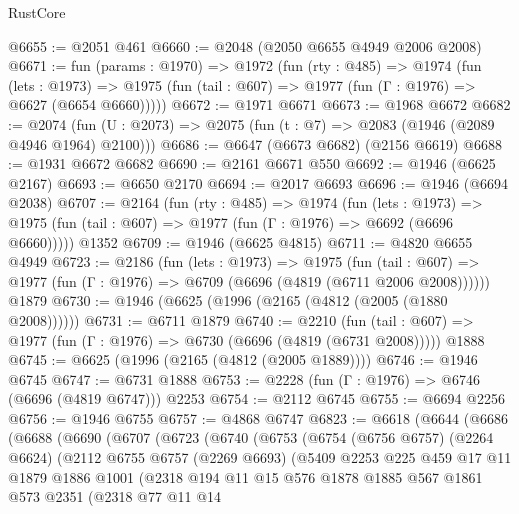 \begin{lexlean}{RustCore}
\begin{coremodule}
@6655 := @2051 @461
@6660 := @2048 (@2050 @6655 @4949 @2006 @2008)
@6671 := fun (params : @1970) =>
  @1972
    (fun (rty : @485) =>
    @1974
      (fun (lets : @1973) =>
      @1975 (fun (tail : @607) => @1977 (fun (Γ : @1976) => @6627 (@6654 @6660)))))
@6672 := @1971 @6671
@6673 := @1968 @6672
@6682 := @2074 (fun (U : @2073) => @2075 (fun (t : @7) => @2083 (@1946 (@2089 @4946 @1964) @2100)))
@6686 := @6647 (@6673 @6682) (@2156 @6619)
@6688 := @1931 @6672 @6682
@6690 := @2161 @6671 @550
@6692 := @1946 (@6625 @2167)
@6693 := @6650 @2170
@6694 := @2017 @6693
@6696 := @1946 (@6694 @2038)
@6707 := @2164
    (fun (rty : @485) =>
    @1974
      (fun (lets : @1973) =>
      @1975 (fun (tail : @607) => @1977 (fun (Γ : @1976) => @6692 (@6696 @6660)))))
    @1352
@6709 := @1946 (@6625 @4815)
@6711 := @4820 @6655 @4949
@6723 := @2186
    (fun (lets : @1973) =>
    @1975
      (fun (tail : @607) => @1977 (fun (Γ : @1976) => @6709 (@6696 (@4819 (@6711 @2006 @2008))))))
    @1879
@6730 := @1946 (@6625 (@1996 (@2165 (@4812 (@2005 (@1880 @2008))))))
@6731 := @6711 @1879
@6740 := @2210
    (fun (tail : @607) => @1977 (fun (Γ : @1976) => @6730 (@6696 (@4819 (@6731 @2008)))))
    @1888
@6745 := @6625 (@1996 (@2165 (@4812 (@2005 @1889))))
@6746 := @1946 @6745
@6747 := @6731 @1888
@6753 := @2228 (fun (Γ : @1976) => @6746 (@6696 (@4819 @6747))) @2253
@6754 := @2112 @6745
@6755 := @6694 @2256
@6756 := @1946 @6755
@6757 := @4868 @6747
@6823 := @6618
    (@6644
      (@6686
        (@6688
          (@6690
            (@6707
              (@6723
                (@6740
                  (@6753
                    (@6754
                      (@6756 @6757)
                      (@2264 @6624)
                      (@2112
                        @6755
                        @6757
                        (@2269 @6693)
                        (@5409
                          @2253
                          @225
                          @459
                          @17
                          @11
                          @1879
                          @1886
                          @1001
                          (@2318
                            @194
                            @11
                            @15
                            @576
                            @1878
                            @1885
                            @567
                            @1861
                            @573
                            @2351
                            (@2318
                              @77
                              @11
                              @14

\end{coremodule}
\end{lexlean}
